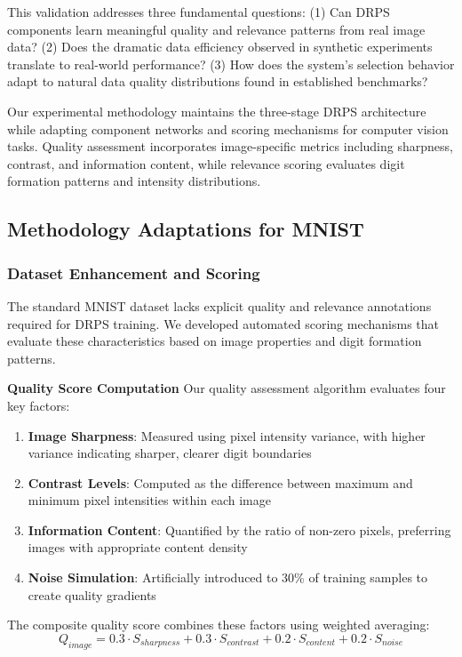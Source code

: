 \documentclass[12pt]{article}
\begin{document}
This validation addresses three fundamental questions: (1) Can DRPS components learn meaningful quality and relevance patterns from real image data? (2) Does the dramatic data efficiency observed in synthetic experiments translate to real-world performance? (3) How does the system's selection behavior adapt to natural data quality distributions found in established benchmarks?

Our experimental methodology maintains the three-stage DRPS architecture while adapting component networks and scoring mechanisms for computer vision tasks. Quality assessment incorporates image-specific metrics including sharpness, contrast, and information content, while relevance scoring evaluates digit formation patterns and intensity distributions.

\subsection{Methodology Adaptations for MNIST}\label{methodology}

\subsubsection{Dataset Enhancement and Scoring}\label{dataset-enhancement}

The standard MNIST dataset lacks explicit quality and relevance annotations required for DRPS training. We developed automated scoring mechanisms that evaluate these characteristics based on image properties and digit formation patterns.

\textbf{Quality Score Computation}
Our quality assessment algorithm evaluates four key factors:

\begin{enumerate}
\item \textbf{Image Sharpness}: Measured using pixel intensity variance, with higher variance indicating sharper, clearer digit boundaries
\item \textbf{Contrast Levels}: Computed as the difference between maximum and minimum pixel intensities within each image
\item \textbf{Information Content}: Quantified by the ratio of non-zero pixels, preferring images with appropriate content density
\item \textbf{Noise Simulation}: Artificially introduced to 30\% of training samples to create quality gradients
\end{enumerate}

The composite quality score combines these factors using weighted averaging:
\begin{equation}
Q_{image} = 0.3 \cdot S_{sharpness} + 0.3 \cdot S_{contrast} + 0.2 \cdot S_{content} + 0.2 \cdot S_{noise}
\end{equation}
\end{document}

